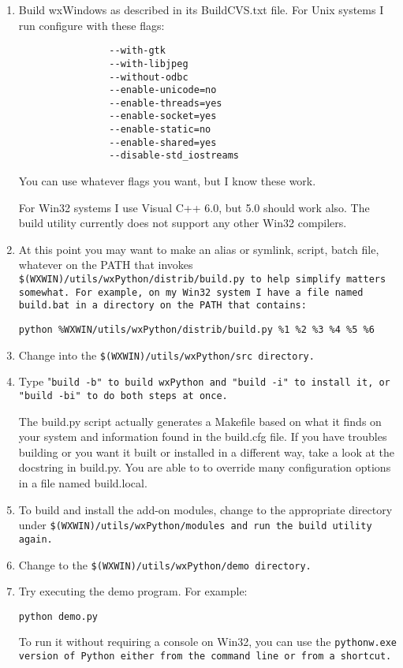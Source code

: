 \begin{enumerate}\itemsep=0pt
\item Build wxWindows as described in its BuildCVS.txt file. For Unix
systems I run configure with these flags:

\begin{verbatim}
                --with-gtk
                --with-libjpeg
                --without-odbc
                --enable-unicode=no
                --enable-threads=yes
                --enable-socket=yes
                --enable-static=no
                --enable-shared=yes
                --disable-std_iostreams
\end{verbatim}

You can use whatever flags you want, but I know these work.

For Win32 systems I use Visual C++ 6.0, but 5.0 should work also. The
build utility currently does not support any other Win32 compilers.
\item At this point you may want to make an alias or symlink, script,
batch file, whatever on the PATH that invokes \tt{\$(WXWIN)/utils/wxPython/distrib/build.py} to
help simplify matters somewhat. For example, on my Win32 system I have a file named
 \tt{build}.bat in a directory on the PATH that contains:

\tt{python \%WXWIN/utils/wxPython/distrib/build.py \%1 \%2 \%3 \%4 \%5 \%6}
\item Change into the \tt{\$(WXWIN)/utils/wxPython/src} directory.
\item Type "\tt{build -b}" to build wxPython and "\tt{build -i}" to
install it, or "\tt{build -bi}" to do both steps at once.

The build.py script actually generates a Makefile based on what it
finds on your system and information found in the build.cfg file.
If you have troubles building or you want it built or installed in
a different way, take a look at the docstring in build.py. You are
able to to override many configuration options in a file named
build.local.
\item To build and install the add-on modules, change to the appropriate
directory under \tt{\$(WXWIN)/utils/wxPython/modules} and run the build
utility again.
\item Change to the \tt{\$(WXWIN)/utils/wxPython/demo} directory.
\item Try executing the demo program. For example:

\tt{python demo.py}

To run it without requiring a console on Win32, you can use the
\tt{pythonw.exe} version of Python either from the command line or from a
shortcut.
\end{enumerate}


